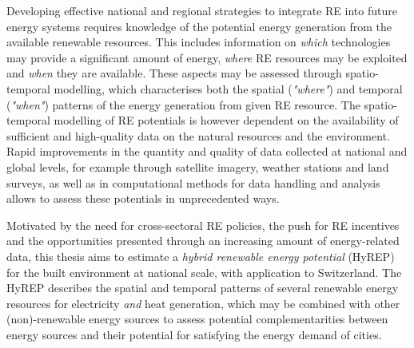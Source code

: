 Developing effective national and regional strategies to integrate RE into future energy systems requires knowledge of the potential energy generation from the available renewable resources. 
This includes information on \textit{which} technologies may provide a significant amount of energy, \textit{where} RE resources may be exploited and \textit{when} they are available. 
These aspects may be assessed through spatio-temporal modelling, which characterises both the spatial (\textit{"where"}) and temporal (\textit{"when"}) patterns of the energy generation from given RE resource.
The spatio-temporal modelling of RE potentials is however dependent on the availability of sufficient and high-quality data on the natural resources and the environment.
Rapid improvements in the quantity and quality of data collected at national and global levels, for example through satellite imagery, weather stations and land surveys, as well as in computational methods for data handling and analysis allows to assess these potentials in unprecedented ways.

Motivated by the need for cross-sectoral RE policies, the push for RE incentives and the opportunities presented through an increasing amount of energy-related data, this thesis aims to estimate a \textit{hybrid renewable energy potential} (HyREP) for the built environment at national scale, with application to Switzerland. 
The HyREP describes the spatial and temporal patterns of several renewable energy resources for electricity \textit{and} heat generation, which may be combined with other (non)-renewable energy sources to assess potential complementarities between energy sources and their potential for satisfying the energy demand of cities. 

